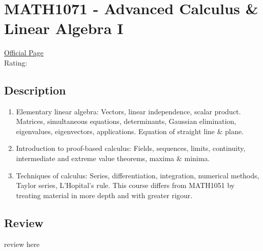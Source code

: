 \hypertarget{MATH1071}{\section{MATH1071 - Advanced Calculus \& Linear Algebra I}}

\large
\textcolor{turbo_purple}{\href{https://my.uq.edu.au/programs-courses/course.html?course_code=MATH1071}{Official Page}} \\
Rating: \cstar\cstar\cstar\cstar\ostar

\normalsize
\subsection*{Description}
\begin{enumerate}
    \item Elementary linear algebra: Vectors, linear independence, scalar product. Matrices, simultaneous equations, determinants, Gaussian elimination, eigenvalues, eigenvectors, applications. Equation of straight line \& plane.
    \item Introduction to proof-based calculus: Fields, sequences, limits, continuity, intermediate and extreme value theorems, maxima \& minima.
    \item Techniques of calculus: Series, differentiation, integration, numerical methods, Taylor series, L'Hopital's rule. This course differs from MATH1051 by treating material in more depth and with greater rigour.
\end{enumerate}

\subsection*{Review}
review here
